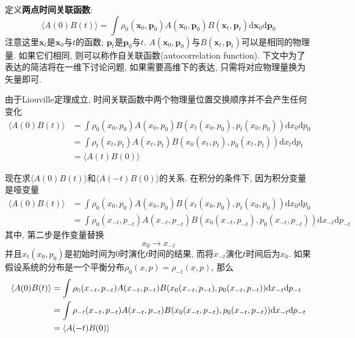     \splitline

    定义\textbf{两点时间关联函数}:
    \begin{equation}
        \langle A(0)B(t) \rangle = \int \rho_0(\bm{x}_0,\bm{p}_0) A(\bm{x}_0,\bm{p}_0) B(\bm{x}_t,\bm{p}_t) \mathrm{d}\bm{x}_0 \mathrm{d}\bm{p}_0
    \end{equation}
    注意这里$\bm{x}_t$是$\bm{x}_0$与$t$的函数; $\bm{p}_t$是$\bm{p}_0$与$t$. $A(\bm{x}_0,\bm{p}_0)$与$B(\bm{x}_t,\bm{p}_t)$可以是相同的物理量. 如果它们相同, 则可以称作自关联函数(autocorrelation function). 下文中为了表达的简洁将在一维下讨论问题, 如果需要高维下的表达, 只需将对应物理量换为矢量即可.

    由于Liouville定理成立, 时间关联函数中两个物理量位置交换顺序并不会产生任何变化
    \begin{equation}\begin{aligned}
        \langle A(0)B(t) \rangle &= \int \rho_0(x_0,p_0) A(x_0,p_0) B(x_t(x_0,p_0),p_t(x_0,p_0)) \mathrm{d}x_0 \mathrm{d}p_0\\
        &= \int \rho_t(x_t,p_t) A(x_t,p_t) B(x_0(x_t,p_t),p_0(x_t,p_t)) \mathrm{d}x_t \mathrm{d}p_t\\
        &= \langle A(t)B(0) \rangle
    \end{aligned}\end{equation}

    现在求$\langle A(0)B(t) \rangle$和$\langle A(-t)B(0) \rangle$的关系. 在积分的条件下, 因为积分变量是哑变量
    \begin{equation}\begin{aligned}
        \langle A(0)B(t) \rangle &= \int \rho_0(x_0,p_0) A(x_0,p_0) B(x_t(x_0,p_0),p_t(x_0,p_0)) \mathrm{d}x_0 \mathrm{d}p_0\\
        &= \int \rho_0 (x_{-t},p_{-t}) A(x_{-t},p_{-t}) B(x_0(x_{-t},p_{-t}),p_0(x_{-t},p_{-t})) \mathrm{d}x_{-t} \mathrm{d}p_{-t}
    \end{aligned}\end{equation}
    其中, 第二步是作变量替换
    \begin{equation}
        x_0 \to x_{-t}
    \end{equation}
    并且$x_t(x_0,p_0)$是初始时间为0时演化$t$时间的结果, 而将$x_{-t}$演化$t$时间后为$x_0$. 如果假设系统的分布是一个平衡分布$\rho_0(x,p) = \rho_{-t}(x, p)$, 那么
    \begin{equation}\begin{aligned}
        \langle A(0)B(t) \rangle &= \int \rho_{\color{red}{0}}(x_{-t},p_{-t}) A(x_{-t},p_{-t}) B(x_0(x_{-t},p_{-t}),p_0(x_{-t},p_{-t})) \mathrm{d}x_{-t} \mathrm{d}p_{-t}\\
        &= \int \rho_{\color{red}{-t}}(x_{-t},p_{-t}) A(x_{-t},p_{-t}) B(x_0(x_{-t},p_{-t}),p_0(x_{-t},p_{-t})) \mathrm{d}x_{-t} \mathrm{d}p_{-t}\\
        &= \langle A(-t)B(0) \rangle
    \end{aligned}\end{equation}

